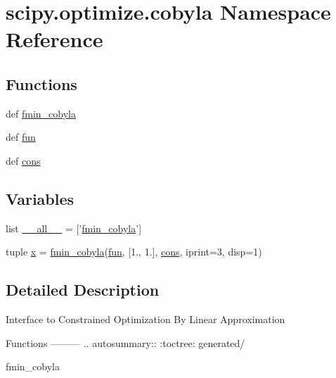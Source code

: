 \hypertarget{namespacescipy_1_1optimize_1_1cobyla}{}\section{scipy.\+optimize.\+cobyla Namespace Reference}
\label{namespacescipy_1_1optimize_1_1cobyla}
\subsection*{Functions}
\begin{DoxyCompactItemize}
\item 
def \hyperlink{namespacescipy_1_1optimize_1_1cobyla_af1c43e75606550919328d3a102b54e83}{fmin\+\_\+cobyla}
\item 
def \hyperlink{namespacescipy_1_1optimize_1_1cobyla_a551298fb52002cac9b8bc38ae5357730}{fun}
\item 
def \hyperlink{namespacescipy_1_1optimize_1_1cobyla_ad7375b5406899d286ea54cb2cb19d68f}{cons}
\end{DoxyCompactItemize}
\subsection*{Variables}
\begin{DoxyCompactItemize}
\item 
list \hyperlink{namespacescipy_1_1optimize_1_1cobyla_a0e6de265f9f99f8bf58266a2fa176f7b}{\+\_\+\+\_\+all\+\_\+\+\_\+} = \mbox{[}'\hyperlink{namespacescipy_1_1optimize_1_1cobyla_af1c43e75606550919328d3a102b54e83}{fmin\+\_\+cobyla}'\mbox{]}
\item 
tuple \hyperlink{namespacescipy_1_1optimize_1_1cobyla_abea32d6fecaef8d33932edaeeba5f50f}{x} = \hyperlink{namespacescipy_1_1optimize_1_1cobyla_af1c43e75606550919328d3a102b54e83}{fmin\+\_\+cobyla}(\hyperlink{namespacescipy_1_1optimize_1_1cobyla_a551298fb52002cac9b8bc38ae5357730}{fun}, \mbox{[}1., 1.\mbox{]}, \hyperlink{namespacescipy_1_1optimize_1_1cobyla_ad7375b5406899d286ea54cb2cb19d68f}{cons}, iprint=3, disp=1)
\end{DoxyCompactItemize}


\subsection{Detailed Description}
\begin{DoxyVerb}Interface to Constrained Optimization By Linear Approximation

Functions
---------
.. autosummary::
   :toctree: generated/

    fmin_cobyla\end{DoxyVerb}
 

